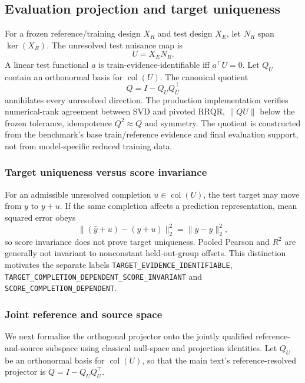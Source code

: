 \documentclass[11pt]{article}
\begin{document}
\subsection{Evaluation projection and target uniqueness}
For a frozen reference/training design $X_R$ and test design $X_E$, let $N_R$ span $\ker(X_R)$. The unresolved test nuisance map is
\[
U=X_EN_R.
\]
A linear test functional $a$ is train-evidence-identifiable iff $a^\top U=0$. Let $Q_U$ contain an orthonormal basis for $\operatorname{col}(U)$. The canonical quotient
\[
Q=I-Q_UQ_U^\top
\]
annihilates every unresolved direction. The production implementation verifies numerical-rank agreement between SVD and pivoted RRQR, $\|QU\|$ below the frozen tolerance, idempotence $Q^2\approx Q$ and symmetry. The quotient is constructed from the benchmark's base train/reference evidence and final evaluation support, not from model-specific reduced training data.

\subsubsection{Target uniqueness versus score invariance}
For an admissible unresolved completion $u\in\operatorname{col}(U)$, the test target may move from $y$ to $y+u$. If the same completion affects a prediction representation, mean squared error obeys
\[
\|(\hat y+u)-(y+u)\|_2^2=\|\hat y-y\|_2^2,
\]
so score invariance does not prove target uniqueness. Pooled Pearson and $R^2$ are generally not invariant to nonconstant held-out-group offsets. This distinction motivates the separate labels \nolinkurl{TARGET_EVIDENCE_IDENTIFIABLE}, \texttt{TARGET\_COMPLETION\_DEPENDENT\_SCORE\_INVARIANT} and \texttt{SCORE\_COMPLETION\_DEPENDENT}.


\subsubsection{Joint reference and source space}
\label{sec:jointsource}
We next formalize the orthogonal projector onto the jointly qualified reference-and-source subspace using classical null-space and projection identities. Let $Q_U$ be an orthonormal basis for $\operatorname{col}(U)$, so that the main text's reference-resolved projector is $Q=I-Q_UQ_U^\top$.
\end{document}
